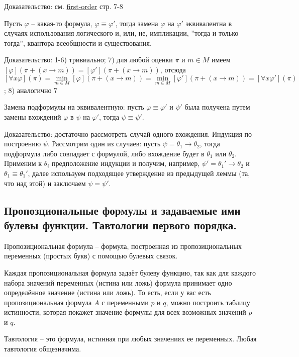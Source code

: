 \documentclass[a4paper, 10pt]{article}
\begin{document}
Доказательство: см. \href{https://drive.google.com/file/d/1V3QNOfANqZbiacI0d_2aLy8l1gZP0rTc/view}{first-order} стр. 7-8

\hfill

Пусть $\varphi$ -- какая-то формула, $\varphi\equiv\varphi'$, тогда замена $\varphi$ на $\varphi'$ эквивалентна в случаях использования логического и, или, не, импликации, ''тогда и только тогда'', квантора всеобщности и существования.

Доказательство: 1-6) тривиально; 7) для любой оценки $\pi$ и $m\in M$ имеем $[\varphi](\pi+(x\to m))=[\varphi'](\pi+(x\to m))$, отсюда $[\forall x\varphi](\pi)=\min\limits_{m \in M}[\varphi](\pi+(x\to m))=\min\limits_{m \in M}[\varphi'](\pi+(x\to m))=[\forall x\varphi'](\pi)$; 8) аналогично 7

\hfill

Замена подформулы на эквивалентную: пусть $\varphi\equiv\varphi'$ и $\psi'$ была получена путем замены вхождений $\varphi$ в $\psi$ на $\varphi'$, тогда $\psi\equiv\psi'$.

Доказательство: достаточно рассмотреть случай одного вхождения. Индукция по построению $\psi$. Рассмотрим один из случаев: пусть $\psi = \theta_1\to\theta_2$, тогда подформула либо совпадает с формулой, либо вхождение будет в $\theta_1$ или $\theta_2$. Применим к $\theta_i$ предположение индукции и получим, например, $\psi'=\theta_1'\to\theta_2$ и $\theta_1\equiv\theta_1'$, далее используем подходящее утверждение из предыдущей леммы (та, что над этой) и заключаем $\psi=\psi'$.

\subsection{Пропозциональные формулы и задаваемые ими булевы функции. Тавтологии первого порядка.}

Пропозициональная формула -- формула, построенная из пропозициональных переменных (простых букв) с помощью булевых связок.

Каждая пропозициональная формула задаёт булеву функцию, так как для каждого набора значений переменных (истина или ложь) формула принимает одно определённое значение (истина или ложь). То есть, если у вас есть пропозициональная формула $A$ с переменными $p$ и $q$, можно построить таблицу истинности, которая покажет значение формулы для всех возможных значений $p$ и $q$.

Тавтология -- это формула, истинная при любых значениях ее переменных. Любая тавтология общезначима.
\end{document}

